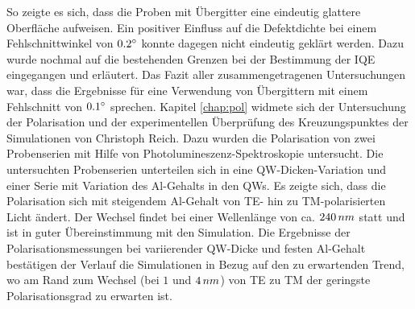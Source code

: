 So zeigte es sich, dass die Proben mit Übergitter eine eindeutig glattere Oberfläche aufweisen. Ein positiver Einfluss auf die Defektdichte bei einem Fehlschnittwinkel von $0.2 \degree$ konnte dagegen nicht eindeutig geklärt werden. Dazu wurde nochmal auf die bestehenden Grenzen bei der Bestimmung der IQE eingegangen und erläutert. Das Fazit aller zusammengetragenen Untersuchungen war, dass die Ergebnisse für eine Verwendung von Übergittern mit einem Fehlschnitt von $0.1\degree$ sprechen.
\newline
Kapitel \ref{chap:pol} widmete sich der Untersuchung der Polarisation und der experimentellen Überprüfung des Kreuzungspunktes der Simulationen von Christoph Reich. Dazu wurden die Polarisation von zwei Probenserien mit Hilfe von Photolumineszenz-Spektroskopie untersucht. Die untersuchten Probenserien unterteilen sich in eine QW-Dicken-Variation und einer Serie mit Variation des Al-Gehalts in den QWs. 
Es zeigte sich, dass die Polarisation sich mit steigendem Al-Gehalt von TE- hin zu TM-polarisierten Licht ändert. Der Wechsel findet bei einer Wellenlänge von ca. $240 \thinspace nm$ statt und ist in guter Übereinstimmung mit den Simulation.
Die Ergebnisse der Polarisationsmessungen bei variierender QW-Dicke und festen Al-Gehalt bestätigen der Verlauf die Simulationen in Bezug auf den zu erwartenden Trend, wo am Rand zum Wechsel (bei $1$ und $4 \thinspace nm$) von TE zu TM der geringste Polarisationsgrad zu erwarten ist. 



